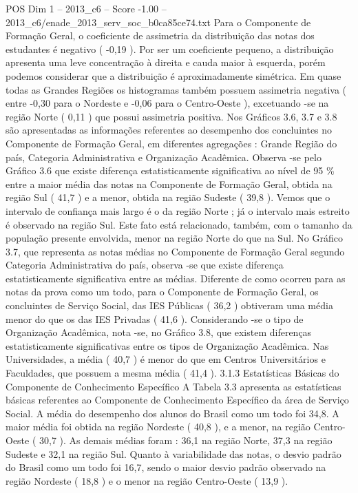 \begin{textsample}{POS Dim 1 – 2013\_c6 – Score -1.00 – 2013\_c6/enade\_2013\_serv\_soc\_b0ca85ce74.txt}
Para o Componente de Formação Geral, o coeficiente de assimetria da distribuição das notas dos estudantes é negativo ( -0,19 ).
Por ser um coeficiente pequeno, a distribuição apresenta uma leve concentração à direita e cauda maior à esquerda, porém podemos considerar que a distribuição é aproximadamente simétrica.
Em quase todas as Grandes Regiões os histogramas também possuem assimetria negativa ( entre -0,30 para o Nordeste e -0,06 para o Centro-Oeste ), excetuando -se na região Norte ( 0,11 ) que possui assimetria positiva.
Nos Gráficos 3.6, 3.7 e 3.8 são apresentadas as informações referentes ao desempenho dos concluintes no Componente de Formação Geral, em diferentes agregações : Grande Região do país, Categoria Administrativa e Organização Acadêmica.
Observa -se pelo Gráfico 3.6 que existe diferença estatisticamente significativa ao nível de 95 \% entre a maior média das notas na Componente de Formação Geral, obtida na região Sul ( 41,7 ) e a menor, obtida na região Sudeste ( 39,8 ).
Vemos que o intervalo de confiança mais largo é o da região Norte ; já o intervalo mais estreito é observado na região Sul.
Este fato está relacionado, também, com o tamanho da população presente envolvida, menor na região Norte do que na Sul.
No Gráfico 3.7, que representa as notas médias no Componente de Formação Geral segundo Categoria Administrativa do país, observa -se que existe diferença estatisticamente significativa entre as médias.
Diferente de como ocorreu para as notas da prova como um todo, para o Componente de Formação Geral, os concluintes de Serviço Social, das IES Públicas ( 36,2 ) obtiveram uma média menor do que os das IES Privadas ( 41,6 ).
Considerando -se o tipo de Organização Acadêmica, nota -se, no Gráfico 3.8, que existem diferenças estatisticamente significativas entre os tipos de Organização Acadêmica.
Nas Universidades, a média ( 40,7 ) é menor do que em Centros Universitários e Faculdades, que possuem a mesma média ( 41,4 ). 3.1.3 Estatísticas Básicas do Componente de Conhecimento Específico A Tabela 3.3 apresenta as estatísticas básicas referentes ao Componente de Conhecimento Específico da área de Serviço Social.
A média do desempenho dos alunos do Brasil como um todo foi 34,8.
A maior média foi obtida na região Nordeste ( 40,8 ), e a menor, na região Centro-Oeste ( 30,7 ).
As demais médias foram : 36,1 na região Norte, 37,3 na região Sudeste e 32,1 na região Sul.
Quanto à variabilidade das notas, o desvio padrão do Brasil como um todo foi 16,7, sendo o maior desvio padrão observado na região Nordeste ( 18,8 ) e o menor na região Centro-Oeste ( 13,9 ).

\end{textsample}
